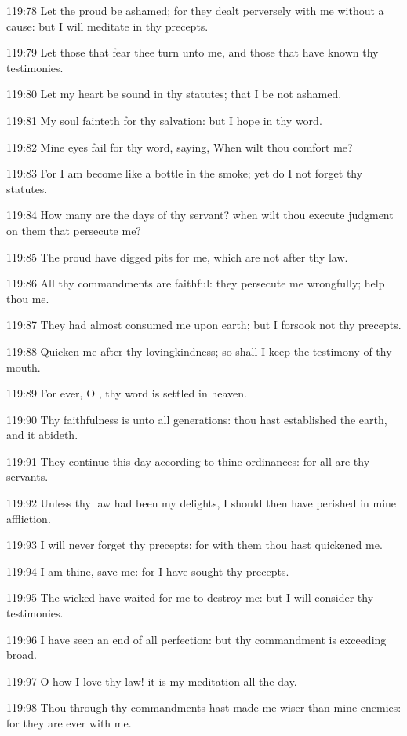 119:78 Let the proud be ashamed; for they dealt perversely with me
without a cause: but I will meditate in thy precepts.

119:79 Let those that fear thee turn unto me, and those that have
known thy testimonies.

119:80 Let my heart be sound in thy statutes; that I be not ashamed.

119:81 My soul fainteth for thy salvation: but I hope in thy word.

119:82 Mine eyes fail for thy word, saying, When wilt thou comfort me?

119:83 For I am become like a bottle in the smoke; yet do I not forget
thy statutes.

119:84 How many are the days of thy servant? when wilt thou execute
judgment on them that persecute me?

119:85 The proud have digged pits for me, which are not after thy law.

119:86 All thy commandments are faithful: they persecute me
wrongfully; help thou me.

119:87 They had almost consumed me upon earth; but I forsook not thy
precepts.

119:88 Quicken me after thy lovingkindness; so shall I keep the
testimony of thy mouth.

119:89 For ever, O \LORD, thy word is settled in heaven.

119:90 Thy faithfulness is unto all generations: thou hast established
the earth, and it abideth.

119:91 They continue this day according to thine ordinances: for all
are thy servants.

119:92 Unless thy law had been my delights, I should then have
perished in mine affliction.

119:93 I will never forget thy precepts: for with them thou hast
quickened me.

119:94 I am thine, save me: for I have sought thy precepts.

119:95 The wicked have waited for me to destroy me: but I will
consider thy testimonies.

119:96 I have seen an end of all perfection: but thy commandment is
exceeding broad.

119:97 O how I love thy law! it is my meditation all the day.

119:98 Thou through thy commandments hast made me wiser than mine
enemies: for they are ever with me.

